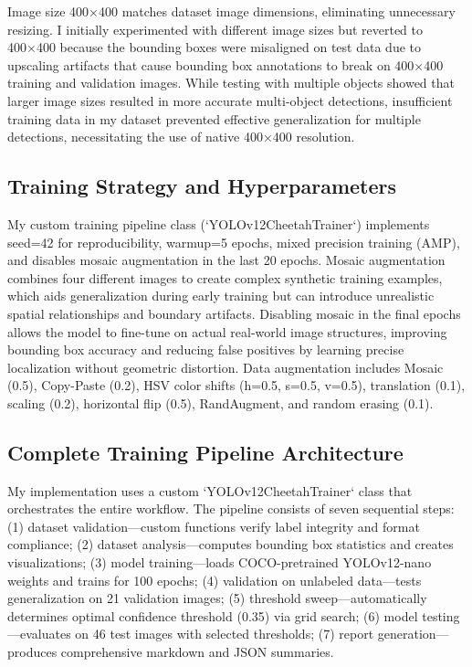 \documentclass[conference]{IEEEtran}
\begin{document}
Image size 400×400 matches dataset image dimensions, eliminating unnecessary resizing. I initially experimented with different image sizes but reverted to 400×400 because the bounding boxes were misaligned on test data due to upscaling artifacts that cause bounding box annotations to break on 400×400 training and validation images. While testing with multiple objects showed that larger image sizes resulted in more accurate multi-object detections, insufficient training data in my dataset prevented effective generalization for multiple detections, necessitating the use of native 400×400 resolution.

\subsection{Training Strategy and Hyperparameters}

My custom training pipeline class (`YOLOv12CheetahTrainer`) implements seed=42 for reproducibility, warmup=5 epochs, mixed precision training (AMP), and disables mosaic augmentation in the last 20 epochs. Mosaic augmentation combines four different images to create complex synthetic training examples, which aids generalization during early training but can introduce unrealistic spatial relationships and boundary artifacts. Disabling mosaic in the final epochs allows the model to fine-tune on actual real-world image structures, improving bounding box accuracy and reducing false positives by learning precise localization without geometric distortion. Data augmentation includes Mosaic (0.5), Copy-Paste (0.2), HSV color shifts (h=0.5, s=0.5, v=0.5), translation (0.1), scaling (0.2), horizontal flip (0.5), RandAugment, and random erasing (0.1).

\subsection{Complete Training Pipeline Architecture}

My implementation uses a custom `YOLOv12CheetahTrainer` class that orchestrates the entire workflow. The pipeline consists of seven sequential steps: (1) dataset validation—custom functions verify label integrity and format compliance; (2) dataset analysis—computes bounding box statistics and creates visualizations; (3) model training—loads COCO-pretrained YOLOv12-nano weights and trains for 100 epochs; (4) validation on unlabeled data—tests generalization on 21 validation images; (5) threshold sweep—automatically determines optimal confidence threshold (0.35) via grid search; (6) model testing—evaluates on 46 test images with selected thresholds; (7) report generation—produces comprehensive markdown and JSON summaries.
\end{document}
